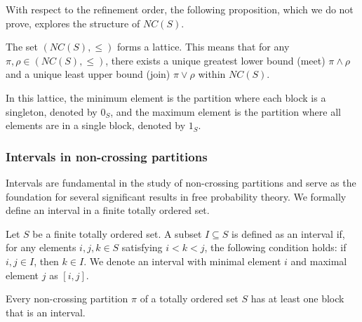 With respect to the refinement order, the following proposition, which we do not prove, explores the structure of $NC(S)$.

\begin{proposition}
The set $(NC(S), \leq)$ forms a lattice. This means that for any $\pi, \rho \in (NC(S), \leq)$, there exists a unique greatest lower bound (meet) $\pi \wedge \rho$ and a unique least upper bound (join) $\pi \vee \rho$ within $NC(S)$.
\end{proposition}

In this lattice, the minimum element is the partition where each block is a singleton, denoted by $0_S$, and the maximum element is the partition where all elements are in a single block, denoted by $1_S$.

\subsubsection{Intervals in non-crossing partitions}

Intervals are fundamental in the study of non-crossing partitions and serve as the foundation for several significant results in free probability theory. We formally define an interval in a finite totally ordered set. 

\begin{definition}
Let $S$ be a finite totally ordered set. A subset $I \subseteq S$ is defined as an interval if, for any elements $i, j, k \in S$ satisfying $i < k < j$, the following condition holds:
if $i, j \in I$, then $k \in I$.
We denote an interval with minimal element $i$ and maximal element $j$ as $[i,j]$.
\end{definition}

\begin{proposition}
Every non-crossing partition $\pi$ of a totally ordered set $S$ has at least one block that is an interval.
\end{proposition}

